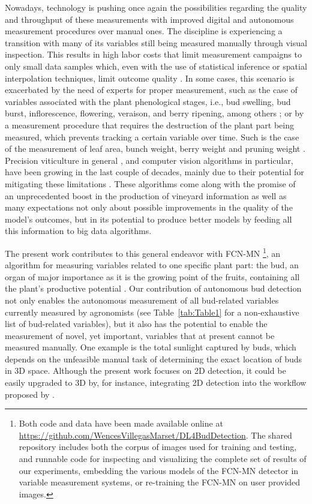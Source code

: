 \documentclass[a4paper,authoryear,review]{elsarticle}
\begin{document}
Nowadays, technology is pushing once again the possibilities regarding the quality and throughput of these measurements with improved digital and autonomous measurement procedures over manual ones. The discipline is experiencing a transition with many of its variables still being measured manually through visual inspection. This results in high labor costs that limit measurement campaigns to only small data samples which, even with the use of statistical inference or spatial interpolation techniques, limit outcome quality \citep{whelan1996spatial}. 
%
In some cases, this scenario is exacerbated by the need of experts for proper measurement, such as the case of variables associated with the plant phenological stages, i.e.,  bud swelling, bud burst, inflorescence, flowering, veraison, and berry ripening, among others \citep{lorenz1995growth}; or by a measurement procedure that requires the destruction of the plant part being measured, which prevents tracking a certain variable over time. Such is the case of the measurement of leaf area, bunch weight, berry weight and pruning weight \citep{kliewer2005leaf}. 
%
Precision viticulture in general \citep{bramley2009lessons}, and computer vision algorithms in particular, have been growing in the last couple of decades, mainly due to their potential for mitigating these limitations \citep{seng2018computer, matese2015technology}. These algorithms come along with the promise of an unprecedented boost in the production of vineyard information as well as many expectations not only about possible improvements in the quality of the model’s outcomes, but in its potential to produce better models by feeding all this information to big data algorithms. 

The present work contributes to this general endeavor with FCN-MN \footnote{Both code and data have been made available online at \url{https://github.com/WencesVillegasMarset/DL4BudDetection}. The shared repository includes both the corpus of images used for training and testing, and runnable code for  inspecting and visualizing the complete set of results of our experiments, embedding the various models of the FCN-MN detector in variable measurement systems, or re-training the FCN-MN on user provided images.}, an algorithm for measuring variables related to one specific plant part: the bud, an organ of major importance as it is the growing point of the fruits, containing all the plant’s productive potential \citep{may2000bud}. Our contribution of autonomous bud detection not only enables the autonomous measurement of all bud-related variables currently measured by agronomists (see Table~\ref{tab:Table1} for a non-exhaustive list of bud-related variables), but it also has the potential to enable the measurement of novel, yet important, variables that at present cannot be measured manually. One example is the total sunlight captured by buds, which depends on the unfeasible manual task of determining the exact location of buds in 3D space.  Although the present work focuses on 2D detection, it could be easily upgraded to 3D by, for instance, integrating 2D detection into the workflow proposed by \citet{diaz2018grapevine}.
\end{document}
